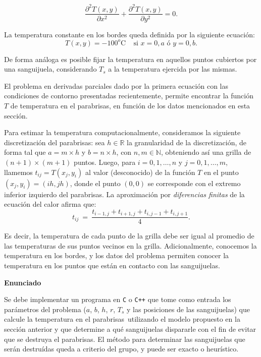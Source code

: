 \documentclass[11pt, a4paper]{article}
\newcommand{\atacante}{sanguijuela}
\newcommand{\objeto}{parabrisas}
\begin{document}
\begin{equation}\label{eq:calor}
\frac{\partial^2T(x,y)}{\partial x^{2}}+\frac{\partial^2 T(x,y)}{\partial y^{2}} = 0.
\end{equation}

\noindent La temperatura constante en los bordes queda definida por la siguiente ecuaci\'on:
\begin{equation}
T(x,y) = -100^o\textrm{C}~~~~~\textrm{si } x = 0,a \textrm{ \'o } y = 0,b.
\label{eq:borde}
\end{equation}

\noindent De forma an\'aloga es posible fijar la temperatura en aquellos puntos cubiertos por una \atacante, considerando $T_s$ a la temperatura ejercida por las mismas.

El problema en derivadas parciales dado por la primera ecuaci\'on con las condiciones de contorno presentadas recientemente, permite encontrar la funci\'on $T$ de temperatura en el \objeto, en funci\'on de los datos mencionados en esta secci\'on.

Para estimar la temperatura computacionalmente, con\-si\-de\-ra\-mos la siguiente discretizaci\'on del \objeto: sea $h \in \mathbb{R}$ la granularidad de la discretizaci\'on, de forma tal que $a = m\times h$ y $b = n \times h$, con $n,m \in \mathbb{N}$, obteniendo as\'i una grilla de $(n+1)\times(m+1)$ puntos. Luego, para $i=0,1,\dots,n$ y $j=0,1,\dots,m$, llamemos $t_{ij} = T(x_j,y_i)$ al valor (desconocido) de la funci\'on $T$ en el punto $(x_j, y_i) = (ih, jh)$, donde el punto $(0,0)$ se corresponde con el extremo inferior izquierdo del \objeto.
La aproximaci\'on por \emph{diferencias finitas} de la ecuaci\'on del calor afirma que:
\begin{equation}
t_{ij} \ =\ \frac{ t_{i-1,j} + t_{i+1,j} + t_{i,j-1} + t_{i,j+1}}{4}.\label{eq:calordd}
\end{equation}

Es decir, la temperatura de cada punto de la grilla debe ser igual al promedio de las tem\-pe\-ra\-tu\-ras de sus puntos vecinos en la grilla. Adicionalmente, conocemos la temperatura en los bordes, y los datos del problema permiten conocer la temperatura en los puntos que est\'an en contacto con las \atacante s.

{\noindent \bf Enunciado}

Se debe implementar un programa en \verb+C+ o \verb-C++- que tome como entrada los par\'ametros del problema ($a$, $b$, $h$, $r$, $T_s$ y las posiciones de las \atacante s) que calcule la temperatura en el \objeto\ utilizando el modelo propuesto en la secci\'on anterior y que determine a qu\'e \atacante s dispararle con el fin de evitar que se destruya el \objeto. El m\'etodo para determinar las \atacante s que ser\'an destru\'idas queda a criterio del grupo, y puede ser exacto o heur\'istico.
\end{document}
